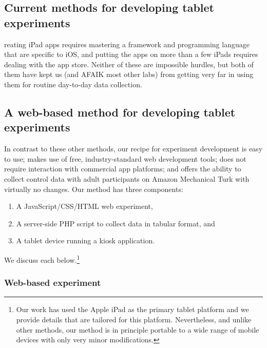 \documentclass[man,noapacite]{apa2}
\begin{document}

\subsection{Current methods for developing tablet experiments}

reating iPad apps requires mastering a framework and programming language that are specific to iOS, and putting the apps on more than a few iPads requires dealing with the app store. Neither of these are impossible hurdles, but both of them have kept us (and AFAIK most other labs) from getting very far in using them for routine day-to-day data collection.


\subsection{A web-based method for developing tablet experiments}

In contrast to these other methods, our recipe for experiment development is easy to use; makes use of free, industry-standard web development tools; does not require interaction with commercial app platforms; and  offers the ability to collect control data with adult participants on Amazon Mechanical Turk \cite{paolacci2010,crump2013} with virtually no changes. Our method has three components:

\begin{enumerate}
\item A JavaScript/CSS/HTML web experiment, 
\item A server-side PHP script to collect data in tabular format, and
\item A tablet device running a kiosk application. 
\end{enumerate}

\noindent We discuss each below.\footnote{Our work has used the Apple iPad as the primary tablet platform and we provide details that are tailored for this platform. Nevertheless, and unlike other methods, our method is in principle portable to a wide range of mobile devices with only very minor modifications.}

\subsubsection{Web-based experiment}
\end{document}
